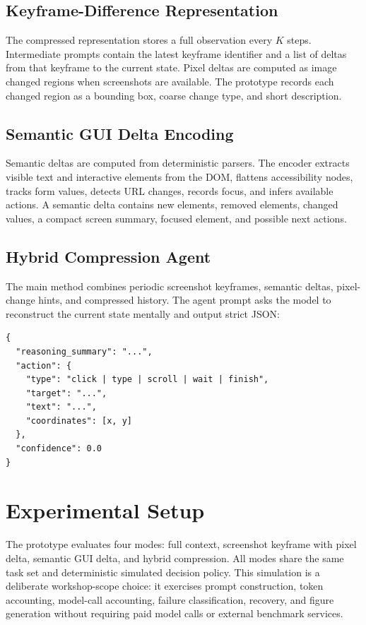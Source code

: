 \documentclass[11pt]{article}
\begin{document}
\subsection{Keyframe-Difference Representation}

The compressed representation stores a full observation every $K$ steps. Intermediate prompts contain the latest keyframe identifier and a list of deltas from that keyframe to the current state. Pixel deltas are computed as image changed regions when screenshots are available. The prototype records each changed region as a bounding box, coarse change type, and short description.

\subsection{Semantic GUI Delta Encoding}

Semantic deltas are computed from deterministic parsers. The encoder extracts visible text and interactive elements from the DOM, flattens accessibility nodes, tracks form values, detects URL changes, records focus, and infers available actions. A semantic delta contains new elements, removed elements, changed values, a compact screen summary, focused element, and possible next actions.

\subsection{Hybrid Compression Agent}

The main method combines periodic screenshot keyframes, semantic deltas, pixel-change hints, and compressed history. The agent prompt asks the model to reconstruct the current state mentally and output strict JSON:

\begin{verbatim}
{
  "reasoning_summary": "...",
  "action": {
    "type": "click | type | scroll | wait | finish",
    "target": "...",
    "text": "...",
    "coordinates": [x, y]
  },
  "confidence": 0.0
}
\end{verbatim}

\section{Experimental Setup}

The prototype evaluates four modes: full context, screenshot keyframe with pixel delta, semantic GUI delta, and hybrid compression. All modes share the same task set and deterministic simulated decision policy. This simulation is a deliberate workshop-scope choice: it exercises prompt construction, token accounting, model-call accounting, failure classification, recovery, and figure generation without requiring paid model calls or external benchmark services.
\end{document}
